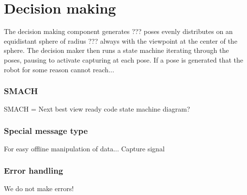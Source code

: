 \chapter{Decision making}
The decision making component generates ??? poses evenly distributes on an equidistant sphere of radius ??? always with the viewpoint at the center of the sphere. The decision maker then runs a state machine iterating through the poses, pausing to activate capturing at each pose. If a pose is generated that the robot for some reason cannot reach...

\subsection{SMACH}
SMACH = Next best view ready code
state machine diagram?

\subsection{Special message type}
For easy offline manipulation of data...
Capture signal

\subsection{Error handling}
We do not make errors!
